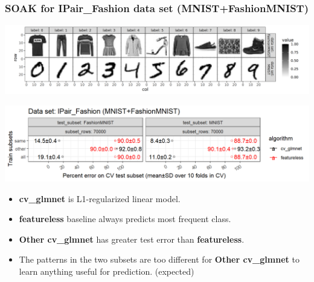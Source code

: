 \documentclass[t]{beamer}
\begin{document}
\begin{frame}
  \frametitle{SOAK for IPair\_Fashion data set (MNIST+FashionMNIST)}

  \includegraphics[width=\textwidth]{data_Classif_MNIST_other_FashionMNIST.png}

  \includegraphics[width=\textwidth]{MNIST_FashionMNIST_error_glmnet_featureless_mean_SD_zoom.png}
  \begin{itemize}
  \item \textbf{cv\_glmnet} is L1-regularized linear model.
  \item \textbf{featureless} baseline always predicts most frequent class.
  \item \textbf{Other cv\_glmnet} has greater test error than
    \textbf{featureless}.
  \item The patterns in the two subsets are too different for \textbf{Other cv\_glmnet} to learn
    anything useful for prediction. (expected)
  \end{itemize}
\end{frame}
\end{document}
